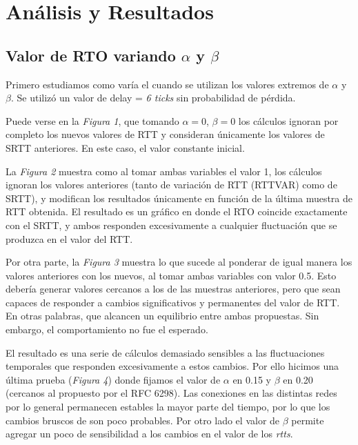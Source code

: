 \section{An\'alisis y Resultados}

    \subsection{Valor de RTO variando $\alpha$ y $\beta$}
    
        Primero estudiamos como var\'ia el \rto{} cuando se utilizan los
        valores extremos de $\alpha$ y $\beta$. Se utiliz\'o un valor 
        de delay = \textit{6 ticks} sin probabilidad de p\'erdida.

        Puede verse en la \textit{Figura 1}, que tomando $\alpha=0$, 
        $\beta=0$ los cálculos ignoran por completo los nuevos 
        valores de RTT y consideran únicamente los valores de SRTT
        anteriores. En este caso, el valor constante inicial.

        La \textit{Figura 2} muestra como al tomar ambas variables el valor
        1, los cálculos ignoran los valores anteriores (tanto de variación
        de RTT (RTTVAR) como de SRTT), y modifican los resultados
        únicamente en función de la última muestra de RTT obtenida. El
        resultado es un gráfico en donde el RTO coincide exactamente con
        el SRTT, y ambos responden excesivamente a cualquier fluctuación
        que se produzca en el valor del RTT.
    
        Por otra parte, la \textit{Figura 3} muestra lo que sucede al 
        ponderar de igual manera los valores anteriores con los nuevos, al
        tomar ambas variables con valor 0.5. Esto debería generar valores
        cercanos a los de las muestras anteriores, pero que sean capaces
        de responder a cambios significativos y permanentes del valor de
        RTT. En otras palabras, que alcancen un equilibrio entre ambas
        propuestas. Sin embargo, el comportamiento no fue el esperado. 
        
        El resultado es una serie de cálculos demasiado sensibles a las
        fluctuaciones temporales que responden excesivamente a estos
        cambios. Por ello hicimos una \'ultima prueba (\textit{Figura 4})
        donde fijamos el valor de $\alpha$ en 0.15 y $\beta$ en 0.20 
        (cercanos al propuesto por el RFC 6298).
        Las conexiones en las distintas redes por lo general permanecen
        estables la mayor parte del tiempo, por lo que los cambios bruscos
        de \rtt{} son poco probables. Por otro lado el valor de $\beta$ 
        permite agregar un poco de sensibilidad a los cambios en el valor
        de los \textit{rtts}.

